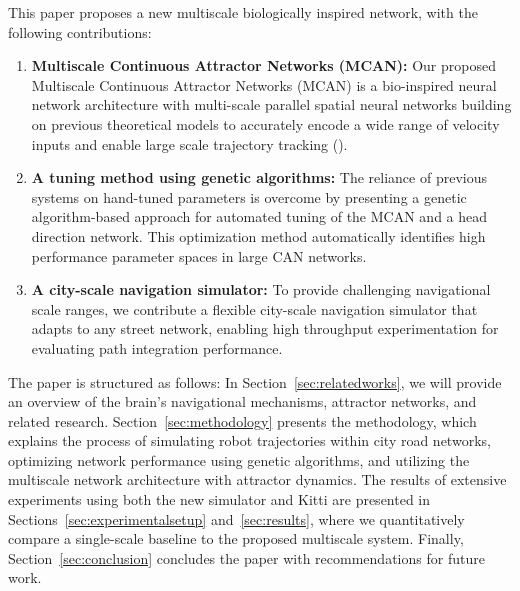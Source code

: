 This paper proposes a new multiscale biologically inspired network, with the following contributions: 
%
%
%
%
%
\begin{enumerate}
    \item \textbf{Multiscale Continuous Attractor Networks (MCAN):} Our proposed Multiscale Continuous Attractor Networks (MCAN) is a bio-inspired neural network architecture with multi-scale parallel spatial neural networks building on previous theoretical models to accurately encode a wide range of velocity inputs and enable large scale trajectory tracking ().   
    \item \textbf{A tuning method using genetic algorithms:} The reliance of previous systems on hand-tuned parameters is overcome by presenting a genetic algorithm-based approach for automated tuning of the MCAN and a head direction network. This optimization method automatically identifies high performance parameter spaces in large CAN networks. 
    \item \textbf{A city-scale navigation simulator:} To provide challenging navigational scale ranges, we contribute a flexible city-scale navigation simulator that adapts to any street network, enabling high throughput experimentation for evaluating path integration performance. %
\end{enumerate}

%

The paper is structured as follows: In Section~\ref{sec:relatedworks}, we will provide an overview of the brain's navigational mechanisms, attractor networks, and related research. Section~\ref{sec:methodology} presents the methodology, which explains the process of simulating robot trajectories within city road networks, optimizing network performance using genetic algorithms, and utilizing the multiscale network architecture with attractor dynamics. The results of extensive experiments using both the new simulator and Kitti are presented in Sections~\ref{sec:experimentalsetup} and~\ref{sec:results}, where we quantitatively compare a single-scale baseline to the proposed multiscale system. Finally, Section~\ref{sec:conclusion} concludes the paper with recommendations for future work.
